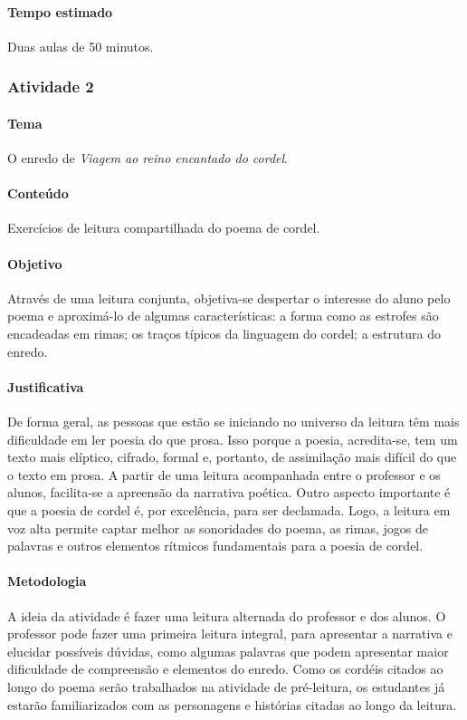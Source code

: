 \documentclass[11pt]{extarticle}
\begin{document}
\paragraph{Tempo estimado} Duas aulas de 50 minutos.


\subsubsection{Atividade 2}


\paragraph{Tema} O enredo de \textit{Viagem ao reino encantado do cordel}.

\paragraph{Conteúdo} Exercícios de leitura compartilhada do poema de cordel.

\paragraph{Objetivo} Através de uma leitura conjunta, objetiva-se despertar o interesse do aluno pelo poema e aproximá-lo de algumas características: a forma como as estrofes são encadeadas em rimas; os traços típicos da linguagem do cordel; a estrutura do enredo.

\paragraph{Justificativa} De forma geral, as pessoas que estão se iniciando no universo da leitura têm mais dificuldade em ler poesia do que prosa. Isso porque a poesia, acredita-se, tem um texto mais elíptico, cifrado, formal e, portanto, de assimilação mais difícil do que o texto em prosa. A partir de uma leitura acompanhada entre o professor e os alunos, facilita-se a apreensão da narrativa poética. Outro aspecto importante é que a poesia de cordel é, por excelência, para ser declamada. Logo, a leitura em voz alta permite captar melhor as sonoridades do poema, as rimas, jogos de palavras e outros elementos rítmicos fundamentais para a poesia de cordel.

\paragraph{Metodologia} A ideia da atividade é fazer uma leitura alternada do professor e dos alunos. O professor pode fazer uma primeira leitura integral, para apresentar a narrativa e elucidar possíveis dúvidas, como algumas palavras que podem apresentar maior dificuldade de compreensão e elementos do enredo. Como os cordéis citados ao longo do poema serão trabalhados na atividade de pré-leitura, os estudantes já estarão familiarizados com as personagens e histórias citadas ao longo da leitura.
\end{document}
